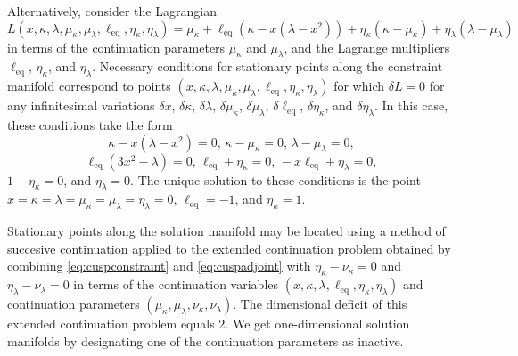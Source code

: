 Alternatively, consider the Lagrangian
\begin{equation}
\label{eq:cusplagr}
L(x,\kappa,\lambda,\mu_\kappa,\mu_\lambda,\ell_\mathrm{eq},\eta_\kappa,\eta_\lambda)=\mu_\kappa+\ell_\mathrm{eq}\left(\kappa-x\left(\lambda-x^2\right)\right)+\eta_\kappa(\kappa-\mu_\kappa)+\eta_\lambda(\lambda-\mu_\lambda)
\end{equation}
in terms of the continuation parameters $\mu_\kappa$ and $\mu_\lambda$, and the Lagrange multipliers $\ell_\mathrm{eq}$, $\eta_\kappa$, and $\eta_\lambda$. Necessary conditions for stationary points along the constraint manifold correspond to points $(x,\kappa,\lambda,\mu_\kappa,\mu_\lambda,\ell_\mathrm{eq},\eta_\kappa,\eta_\lambda)$ for which $\delta L=0$ for any infinitesimal variations $\delta x$, $\delta\kappa$, $\delta\lambda$, $\delta\mu_\kappa$, $\delta\mu_\lambda$, $\delta\ell_\mathrm{eq}$, $\delta\eta_\kappa$, and $\delta\eta_\lambda$. In this case, these conditions take the form
\begin{equation}
\label{eq:cuspconstraint}
\kappa-x\left(\lambda-x^2\right)=0,\,\kappa-\mu_\kappa=0,\,\lambda-\mu_\lambda=0,
\end{equation}
\begin{equation}
\label{eq:cuspadjoint}
\ell_\mathrm{eq}(3x^2-\lambda)=0,\,\ell_\mathrm{eq}+\eta_\kappa=0,\,-x\ell_\mathrm{eq}+\eta_\lambda=0,
\end{equation}
$1-\eta_\kappa=0$, and $\eta_\lambda=0$. The unique solution to these conditions is the point $x=\kappa=\lambda=\mu_\kappa=\mu_\lambda=\eta_\lambda=0$, $\ell_\mathrm{eq}=-1$, and $\eta_\kappa=1$.

Stationary points along the solution manifold may be located using a method of succesive continuation applied to the extended continuation problem obtained by combining \eqref{eq:cuspconstraint} and \eqref{eq:cuspadjoint} with $\eta_\kappa-\nu_\kappa=0$ and $\eta_\lambda-\nu_\lambda=0$ in terms of the continuation variables $(x,\kappa,\lambda,\ell_\mathrm{eq},\eta_\kappa,\eta_\lambda)$ and continuation parameters $(\mu_\kappa,\mu_\lambda,\nu_\kappa,\nu_\lambda)$. The dimensional deficit of this extended continuation problem equals $2$. We get one-dimensional solution manifolds by designating one of the continuation parameters as inactive.

